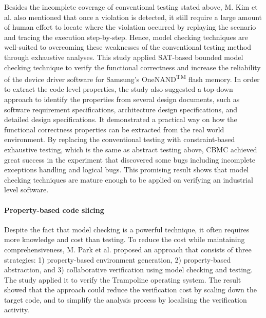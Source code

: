 Besides the incomplete coverage of conventional testing stated above, M. Kim et al. \cite{4639323, Kim:2008:FVF:1429078.1429092, 5510242} also mentioned that once a violation is detected, it still require a large amount of human effort to locate where the violation occurred by replaying the scenario and tracing the execution step-by-step. Hence, model checking techniques are well-suited to overcoming these weaknesses of the conventional testing method through exhaustive analyses. This study applied SAT-based bounded model checking technique to verify the functional correctness and increase the reliability of the device driver software for Samsung's OneNAND\textsuperscript{TM} flash memory. In order to extract the code level properties, the study also suggested a top-down approach to identify the properties from several design documents, such as software requirement specifications, architecture design specifications, and detailed design specifications. It demonstrated a practical way on how the functional correctness properties can be extracted from the real world environment. By replacing the conventional testing with constraint-based exhaustive testing, which is the same as abstract testing above, CBMC achieved great success in the experiment that discovered some bugs including incomplete exceptions handling and logical bugs. This promising result shows that model checking techniques are mature enough to be applied on verifying an industrial level software.


\paragraph{Property-based code slicing}
Despite the fact that model checking is a powerful technique, it often requires more knowledge and cost than testing. To reduce the cost while maintaining comprehensiveness, M. Park et al. \cite{DBLP:journals/corr/abs-1301-0042} proposed an approach that consists of three strategies: 1) property-based environment generation, 2) property-based abstraction, and 3) collaborative verification using model checking and testing. The study applied it to verify the Trampoline operating system. The result showed that the approach could reduce the verification cost by scaling down the target code, and to simplify the analysis process by localising the verification activity.

